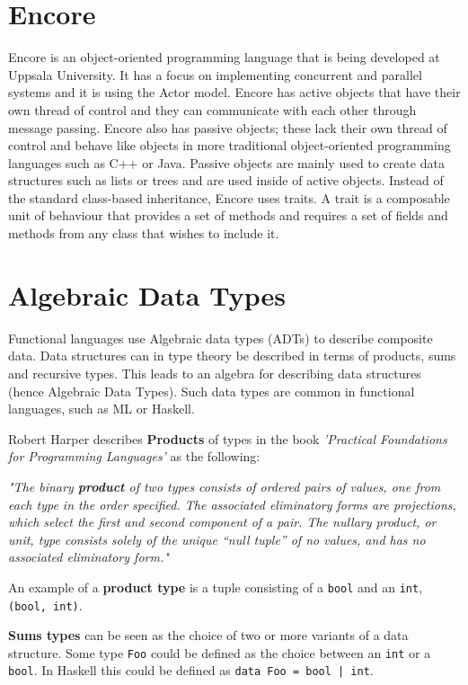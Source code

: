 \documentclass[10pt]{report}
\def\code#1{\texttt{#1}} %
\begin{document}
%
\label{ch:background}
%

\section{Encore}
\par{Encore is an object-oriented programming language that is being developed at Uppsala University\cite{Encore}. It has a focus on implementing concurrent and parallel systems and it is using the Actor model. Encore has active objects that have their own thread of control and they can communicate with each other through message passing. Encore also has passive objects; these lack their own thread of control and behave like objects in more traditional object-oriented programming languages such as C++ or Java. Passive objects are mainly used to create data structures such as lists or trees and are used inside of active objects. Instead of the standard class-based inheritance, Encore uses traits.  A trait is a composable unit of behaviour that provides a set of methods and requires a set of fields and methods from any class that wishes to include it.} %
\section{Algebraic Data Types}
\par{Functional languages use Algebraic data types (ADTs) to describe composite data. Data structures can in type theory be described in terms of products, sums and recursive types. This leads to an algebra for describing data structures (hence Algebraic Data Types). Such data types are common in functional languages, such as ML or Haskell.}

\par{Robert Harper describes \textbf{Products} of types in the book \textit{'Practical Foundations for Programming Languages'} as the following:}

\par{\textit{"The binary \textbf{product} of two types consists of ordered pairs of values, one from each type in the order specified. The associated eliminatory forms are projections, which select the first and second component of a pair. The nullary product, or unit, type consists solely of the unique “null tuple” of no values, and has no associated eliminatory form."}}
\par{An example of a \textbf{product type} is a tuple consisting of a \code{bool} and an \code{int}, \code{(bool, int)}.}
\par{\textbf{Sums types} can be seen as the choice of two or more variants of a data structure. Some type \code{Foo} could be defined as the choice between an \code{int} or a \code{bool}. In Haskell this could be defined as \code{data Foo = bool | int}.}
\end{document}
